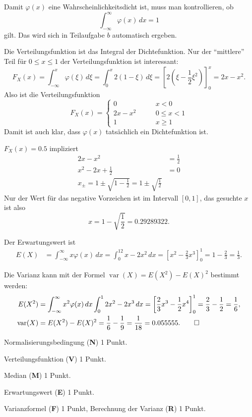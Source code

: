 \begin{loesung}
\begin{teilaufgaben}
\item Damit $\varphi(x)$ eine Wahrscheinlichkeitsdicht ist, muss man 
kontrollieren, ob
\[
\int_{-\infty}^\infty\varphi(x)\,dx=1
\]
gilt. Das
wird sich in Teilaufgabe $b$ automatisch ergeben.
\item Die Verteilungsfunktion ist das Integral der Dichtefunktion.
Nur der ``mittlere'' Teil für $0\le x\le 1$
der Verteilungsfunktion ist interessant:
\[
F_X(x)=\int_{-\infty}^x\varphi(\xi)\,d\xi =\int_0^x2(1-\xi)\,d\xi=
\left[2(\xi-\frac12\xi^2)\right]_0^x=2x-x^2.
\]
Also ist die Verteilungsfunktion
\[
F_X(x)=\begin{cases}
     0&\qquad x < 0\\
2x-x^2&\qquad 0\le x < 1\\
     1&\qquad x \ge 1
\end{cases}
\]
Damit ist auch klar, dass $\varphi(x)$ tatsächlich ein Dichtefunktion ist.
\item $F_X(x)=0.5$ impliziert
\begin{align*}
2x-x^2&=\frac12\\
x^2-2x+\frac12&=0\\
x_\pm=1\pm\sqrt{1-\frac12}=1\pm\sqrt{\frac12}
\end{align*}
Nur der Wert für das negative Vorzeichen ist im Intervall $[0,1]$, das gesuchte
$x$ ist also
\[
x=1-\sqrt{\frac12}=0.29289322.
\]
\item
Der Erwartungswert ist
\begin{align*}
E(X)&=\int_{-\infty}^{\infty}x\varphi(x)\,dx
=\int_0^12x-2x^2\,dx=\left[ x^2-\frac23x^3\right]_0^1=1-\frac23=\frac13.
\end{align*}
\item Die Varianz kann mit der Formel
$\operatorname{var}(X)=E(X^2)-E(X)^2$ bestimmt werden:
\begin{align*}
E(X^2)&=\int_{-\infty}^{\infty}x^2\varphi(x)\,dx
\int_0^1 2x^2-2x^3\,dx
=\left[\frac23x^3-\frac12x^4\right]_0^1
=\frac23-\frac12=\frac16,
\\
\operatorname{var}(X)&=E(X^2)-E(X)^2=\frac16 - \frac19=\frac1{18}=0.055555.
\qedhere
\end{align*}
\end{teilaufgaben}
\end{loesung}

\begin{bewertung}
\begin{teilaufgaben}
\item Normalisierungsbedingung ({\bf N}) 1 Punkt.
\item Verteilungsfunktion ({\bf V}) 1 Punkt.
\item Median ({\bf M}) 1 Punkt.
\item Erwartungswert ({\bf E}) 1 Punkt.
\item Varianzformel ({\bf F}) 1 Punkt, Berechnung der Varianz ({\bf R}) 1 Punkt.
\end{teilaufgaben}
\end{bewertung}

